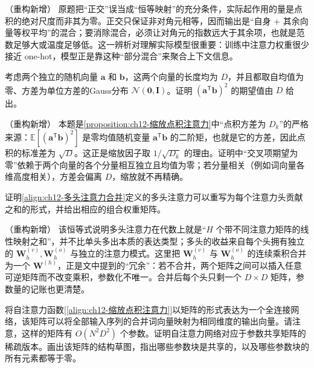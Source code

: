 \documentclass[../../main.tex]{subfiles}
\begin{document}
\begin{remark}（重构新增）
原题把“正交”误当成“恒等映射”的充分条件，实际起作用的量是点积的绝对尺度而非其为零。正交只保证非对角元相等，因而输出是“自身 + 其余向量等权平均”的混合；要消除混合，必须让对角元的指数远大于其余项，也就是范数足够大或温度足够低。这一辨析对理解实际模型很重要：训练中注意力权重很少接近 one-hot，模型正是靠这种“部分混合”来聚合上下文信息。
\end{remark}

\begin{exercise}[（$\star$）]\label{exercise:ch12-04}
考虑两个独立的随机向量 $\mathbf{a}$ 和 $\mathbf{b}$，这两个向量的长度均为 $D$，并且都取自均值为零、方差为单位方差的Gauss分布 $\mathcal{N}(\mathbf{0},\mathbf{I})$。证明 $\left(\mathbf{a}^{\mathsf{T}}\mathbf{b}\right)^{2}$ 的期望值由 $D$ 给出。
\end{exercise}

\begin{remark}（重构新增）
本题是\cref{proposition:ch12-缩放点积注意力}中“点积方差为 $D_k$”的严格来源：$\mathbb{E}[(\mathbf{a}^{\mathsf{T}}\mathbf{b})^{2}]$ 是零均值随机变量 $\mathbf{a}^{\mathsf{T}}\mathbf{b}$ 的二阶矩，也就是它的方差，因此点积的标准差为 $\sqrt{D}$。这正是缩放因子取 $1/\sqrt{D_k}$ 的理由。证明中“交叉项期望为零”依赖于两个向量的各个分量相互独立且均值为零；若分量相关（例如词向量各维高度相关），方差会偏离 $D$，缩放就不再精确。
\end{remark}

\begin{exercise}\label{exercise:ch12-05}
证明\eqref{align:ch12-多头注意力合并}定义的多头注意力可以重写为每个注意力头贡献之和的形式，并给出相应的组合权重矩阵。
\end{exercise}

\begin{remark}（重构新增）
该恒等式说明多头注意力在代数上就是“$H$ 个带不同注意力矩阵的线性映射之和”，并不比单头多出本质的表达类型；多头的收益来自每个头拥有独立的 $\mathbf{W}_h^{(v)},\mathbf{W}_h^{(o)}$ 与独立的注意力模式。这里把 $\mathbf{W}_h^{(v)}$ 与 $\mathbf{W}_h^{(o)}$ 的连续乘积合并为一个 $\mathbf{W}^{(h)}$，正是文中提到的“冗余”：若不合并，两个矩阵之间可以插入任意可逆矩阵而不改变乘积，参数化不唯一。合并后每个头只剩一个 $D\times D$ 矩阵，参数量的记账也更清楚。
\end{remark}

\begin{exercise}\label{exercise:ch12-06}
将自注意力函数[\eqref{align:ch12-缩放点积注意力}]以矩阵的形式表达为一个全连接网络，该矩阵可以将全部输入序列的合并词向量映射为相同维度的输出向量。请注意，这样的矩阵有 $O(N^{2}D^{2})$ 个参数。证明自注意力网络对应于参数共享矩阵的稀疏版本。画出该矩阵的结构草图，指出哪些参数块是共享的，以及哪些参数块的所有元素都等于零。
\end{exercise}
\end{document}
